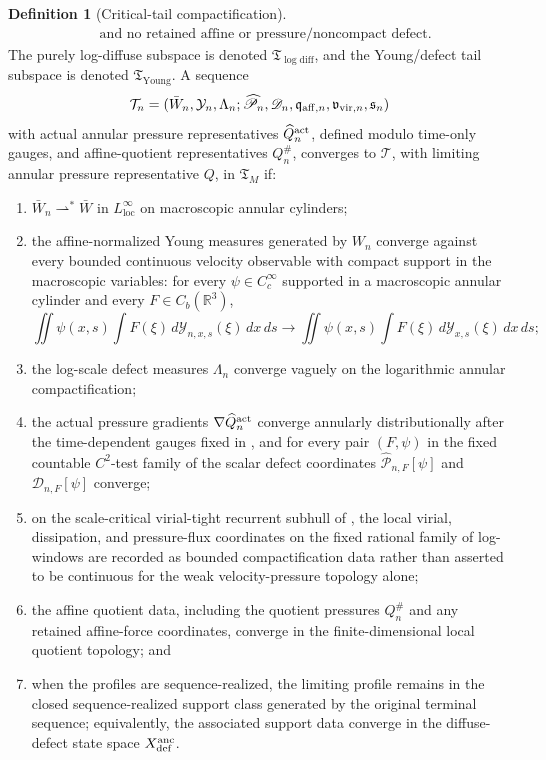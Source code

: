 \documentclass[11pt]{amsart}
\numberwithin{equation}{section}
\theoremstyle{plain}
\theoremstyle{definition}
\newtheorem{definition}[definition]{Definition}
\theoremstyle{remark}
\newcommand{\loc}{\mathrm{loc}}
\newcommand{\Tcrit}{\mathfrak T_M}
\newcommand{\Tyoung}{\mathfrak T_{\mathrm{Young}}}
\newcommand{\Tlogdiff}{\mathfrak T_{\log\mathrm{diff}}}
\begin{document}
\begin{definition}[Critical-tail compactification]
\[\begin{aligned}
   &\text{and no retained affine or pressure/noncompact defect.}
\end{aligned}
\]
The purely log-diffuse subspace is denoted \(\Tlogdiff\), and the Young/defect
tail subspace is denoted \(\Tyoung\).
A sequence
\[
   \mathcal T_n=(\bar W_n,\mathcal Y_n,\Lambda_n;
   \widehat{\mathscr P}_n,\mathscr D_n,
   \mathfrak q_{{\rm aff},n},\mathfrak v_{{\rm vir},n},\mathfrak s_n)
\]
with actual annular pressure representatives \(\widehat Q_n^{\rm act}\), defined
modulo time-only gauges, and affine-quotient representatives \(Q_n^\#\),
converges to \(\mathcal T\), with limiting annular pressure representative \(Q\),
in \(\Tcrit\) if:
\begin{enumerate}[label=\textup{(\roman*)}]
   \item \(\bar W_n\rightharpoonup^\ast\bar W\) in
   \(L^\infty_{\loc}\) on macroscopic annular cylinders;
   \item the affine-normalized Young measures generated by \(W_n\) converge
   against every bounded continuous velocity observable with compact support in
   the macroscopic variables: for every
   \(\psi\in C_c^\infty\) supported in a macroscopic annular cylinder and every
   \(F\in C_b(\mathbb R^3)\),
   \[
      \iint \psi(x,s)
      \int F(\xi)\,d\mathcal Y_{n,x,s}(\xi)\,dx\,ds
      \longrightarrow
      \iint \psi(x,s)
      \int F(\xi)\,d\mathcal Y_{x,s}(\xi)\,dx\,ds ;
   \]
   \item the log-scale defect measures \(\Lambda_n\) converge vaguely on the
   logarithmic annular compactification;
   \item the actual pressure gradients
   \(\nabla\widehat Q_n^{\rm act}\) converge annularly distributionally after
   the time-dependent gauges fixed in
   , and for every pair
   \((F,\psi)\) in the fixed countable \(C^2\)-test family of
    the scalar defect
   coordinates \(\widehat{\mathscr P}_{n,F}[\psi]\) and
   \(\mathscr D_{n,F}[\psi]\) converge;
   \item on the scale-critical virial-tight recurrent subhull of
   , the local virial,
   dissipation, and pressure-flux coordinates on the fixed rational family of
   log-windows are recorded as bounded compactification data rather than
   asserted to be continuous for the weak velocity-pressure topology alone;
   \item the affine quotient data, including the quotient pressures
   \(Q_n^\#\) and any retained affine-force coordinates, converge in the
   finite-dimensional local quotient topology; and
   \item when the profiles are sequence-realized, the limiting profile remains in
   the closed sequence-realized support class generated by the original terminal
   sequence; equivalently, the associated support data converge in the
   diffuse-defect state space \(X_{\rm def}^{\rm anc}\).
\end{enumerate}


\end{definition}
\end{document}
